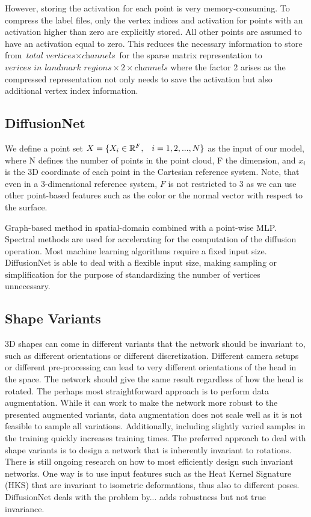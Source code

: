 \documentclass[class=article, crop=false]{standalone}
\begin{document}
However, storing the activation for each point is very memory-consuming. To compress the label files, only the vertex indices and activation for points with an activation higher than zero are explicitly stored. All other points are assumed to have an activation equal to zero. This reduces the necessary information to store from $\textit{total vertices} \times \textit{channels}$ for the sparse matrix representation to $\textit{verices in landmark regions} \times \textit{2} \times \textit{channels}$ where the factor 2 arises as the compressed representation not only needs to save the activation but also additional vertex index information.

\subsection{DiffusionNet}
We define a point set \begin{math}X=\{X_i \in \mathbb{R}^F,\hspace{0.3cm}i = 1,2,...,N\}\end{math} as the input of our model, where N defines the number of points in the point cloud, F the dimension, and $x_i$ is the 3D coordinate of each point in the Cartesian reference system. Note, that even in a 3-dimensional reference system, $F$ is not restricted to 3 as we can use other point-based features such as the color or the normal vector with respect to the surface.

Graph-based method in spatial-domain combined with a point-wise MLP. Spectral methods are used for accelerating for the computation of the diffusion operation.
Most machine learning algorithms require a fixed input size. DiffusionNet is able to deal with a flexible input size, making sampling or simplification for the purpose of standardizing the number of vertices unnecessary.

\subsection{Shape Variants}
3D shapes can come in different variants that the network should be invariant to, such as different orientations or different discretization. Different camera setups or different pre-processing can lead to very different orientations of the head in the space. The network should give the same result regardless of how the head is rotated. The perhaps most straightforward approach is to perform data augmentation. While it can work to make the network more robust to the presented augmented variants, data augmentation does not scale well as it is not feasible to sample all variations. Additionally, including slightly varied samples in the training quickly increases training times. The preferred approach to deal with shape variants is to design a network that is inherently invariant to rotations. There is still ongoing research on how to most efficiently design such invariant networks. One way is to use input features such as the Heat Kernel Signature (HKS) that are invariant to isometric deformations, thus also to different poses. DiffusionNet deals with the problem by... adds robustness but not true invariance.
\end{document}

